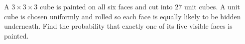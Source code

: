 A $3\times3\times3$ cube is painted on all six faces and cut into $27$ unit cubes. A unit cube is chosen uniformly and rolled so each face is equally likely to be hidden underneath. Find the probability that exactly one of its five visible faces is painted.
